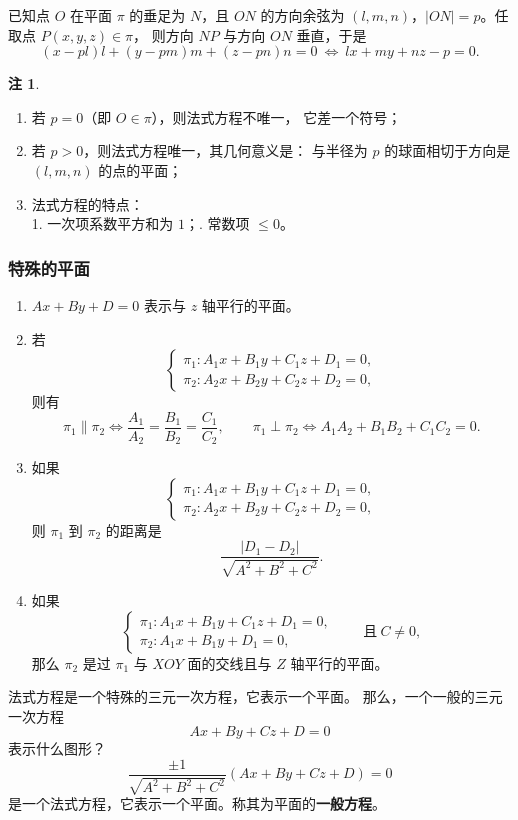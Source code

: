 \documentclass[UTF8,11pt]{ctexart}
\theoremstyle{cnthm}
\newtheorem{rem}[thm]{注}
\begin{document}
已知点 $O$ 在平面 $\pi$ 的垂足为 $N$，且 $ON$ 的方向余弦为
$(l,m,n)$，$|ON|=p$。任取点 $P(x,y,z)\in\pi$，
则方向 $NP$ 与方向 $ON$ 垂直，于是
\[
(x-pl)l+(y-pm)m+(z-pn)n=0
\ \Longleftrightarrow\
lx+my+nz-p=0 .
\]

\begin{rem}

\end{rem}

\begin{enumerate}
\item[①] 若 $p=0$（即 $O\in\pi$），则法式方程不唯一，
它差一个符号；
\item[②] 若 $p>0$，则法式方程唯一，其几何意义是：
与半径为 $p$ 的球面相切于方向是 $(l,m,n)$ 的点的平面；
\item[③] 法式方程的特点：\\
1. 一次项系数平方和为 $1$；. 常数项 $\leq0$。
\end{enumerate}

\subsubsection*{特殊的平面}

\begin{enumerate}
\item $Ax+By+D=0$ 表示与 $z$ 轴平行的平面。
\item 若
\[
\begin{cases}
\pi_1:A_1x+B_1y+C_1z+D_1=0,\\
\pi_2:A_2x+B_2y+C_2z+D_2=0,
\end{cases}
\]
则有
\[
\pi_1\parallel\pi_2
\Longleftrightarrow
\frac{A_1}{A_2}=\frac{B_1}{B_2}=\frac{C_1}{C_2},
\qquad
\pi_1\perp\pi_2
\Longleftrightarrow
A_1A_2+B_1B_2+C_1C_2=0 .
\]
\item 如果
\[
\begin{cases}
\pi_1:A_1x+B_1y+C_1z+D_1=0,\\
\pi_2:A_2x+B_2y+C_2z+D_2=0,
\end{cases}
\]
则 $\pi_1$ 到 $\pi_2$ 的距离是
\[
\frac{|D_1-D_2|}{\sqrt{A^2+B^2+C^2}} .
\]
\item 如果
\[
\begin{cases}
\pi_1:A_1x+B_1y+C_1z+D_1=0,\\
\pi_2:A_1x+B_1y+D_1=0,
\end{cases}
\qquad\text{且}\ C\neq0,
\]
那么 $\pi_2$ 是过 $\pi_1$ 与 $XOY$ 面的交线且与 $Z$ 轴平行的平面。
\end{enumerate}

法式方程是一个特殊的三元一次方程，它表示一个平面。
那么，一个一般的三元一次方程
\[
Ax+By+Cz+D=0
\]
表示什么图形？
\[
\frac{\pm1}{\sqrt{A^2+B^2+C^2}}(Ax+By+Cz+D)=0
\]
是一个法式方程，它表示一个平面。称其为平面的\textbf{一般方程}。
\end{document}
